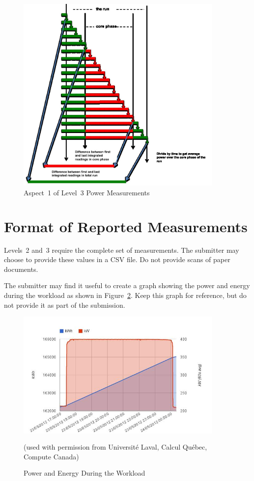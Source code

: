 \begin{figure}[t]
\centering
\includegraphics[width=4in]{fig3-5}
\caption{Aspect~1 of Level~3 Power Measurements}
\label{fig:a1l3pm}
\end{figure}

\section{Format of Reported Measurements}
\label{sec:FoRM}
\noindent
Levels~2 and~3 require the complete set of measurements.
The submitter may choose to provide these values in a CSV file.
Do not provide scans of paper documents.
\wl

\noindent
The submitter may find it useful to create a graph showing the power and energy during the workload as shown in Figure~\ref{fig:powengwl}.
Keep this graph for reference, but do not provide it as part of the submission.


\begin{figure}
\centering
\includegraphics[width=4in]{fig3-6}
\caption{Power and Energy During the Workload}
(used with permission from Universit\'{e} Laval, Calcul Qu\'{e}bec, Compute Canada)
\label{fig:powengwl}
\end{figure}


